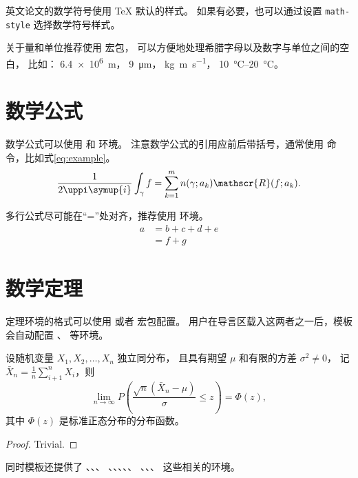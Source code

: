 英文论文的数学符号使用 \TeX{} 默认的样式。
如果有必要，也可以通过设置 \verb|math-style| 选择数学符号样式。

关于量和单位推荐使用
\href{http://mirrors.ctan.org/macros/latex/contrib/siunitx/siunitx.pdf}{}
宏包，
可以方便地处理希腊字母以及数字与单位之间的空白，
比如：
\SI{6.4e6}{m}，
\SI{9}{\micro\meter}，
\si{kg.m.s^{-1}}，
\SIrange{10}{20}{\degreeCelsius}。



\section{数学公式}

数学公式可以使用  和  环境。
注意数学公式的引用应前后带括号，通常使用  命令，比如式\eqref{eq:example}。
\begin{equation}
  \frac{1}{2 \uppi \symup{i}} \int_\gamma f = \sum_{k=1}^m n(\gamma; a_k) \mathscr{R}(f; a_k).
  \label{eq:example}
\end{equation}

多行公式尽可能在“=”处对齐，推荐使用  环境。
\begin{align}
  a & = b + c + d + e \\
    & = f + g
\end{align}



\section{数学定理}

定理环境的格式可以使用  或者  宏包配置。
用户在导言区载入这两者之一后，模板会自动配置 、 等环境。

\begin{theorem}
  设随机变量 $X_1, X_2, \dots, X_n$ 独立同分布， 且具有期望 $\mu$ 和有限的方差 $\sigma^2 \ne 0$，
  记 $\bar{X}_n = \frac{1}{n} \sum_{i+1}^n X_i$，则
  \begin{equation}
    \lim_{n \to \infty} P \left(\frac{\sqrt{n} \left( \bar{X}_n - \mu \right)}{\sigma} \le z \right) = \Phi(z),
  \end{equation}
  其中 $\Phi(z)$ 是标准正态分布的分布函数。
\end{theorem}
\begin{proof}
  Trivial.
\end{proof}

同时模板还提供了 、、、
、、、、、
、、、 这些相关的环境。
